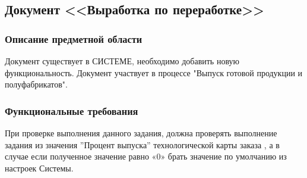 \subsection{Документ <<Выработка по переработке>>}
\label{doc:ProductionLine}



\subsubsection{Описание предметной области}

Документ существует в СИСТЕМЕ, необходимо добавить новую функциональность.
Документ участвует в процессе "Выпуск готовой продукции и полуфабрикатов".



\subsubsection{Функциональные требования}


При проверке выполнения данного задания, должна проверять  выполнение задания из значения ''Процент выпуска'' технологической карты заказа , а в случае если полученное значение равно «0» брать значение по умолчанию из настроек Системы.